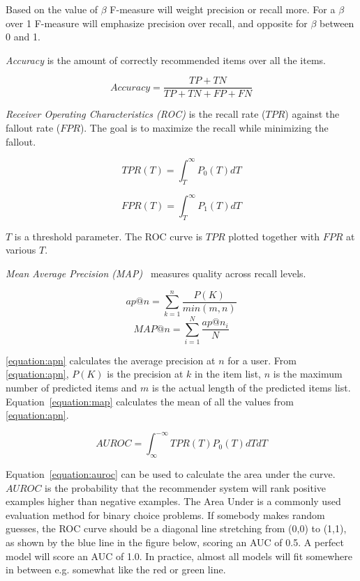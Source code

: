 Based on the value of $\beta$ F-measure will weight precision or recall more.
For a $\beta$ over 1 F-measure will emphasize precision over recall, and
opposite for $\beta$ between 0 and 1.

\textit{Accuracy} is the amount of correctly recommended items over all the
items.

\begin{equation}
    Accuracy = \frac{TP+TN}{TP+TN+FP+FN}
    \label{equation:accuracy}
\end{equation}

\textit{Receiver Operating Characteristics (ROC)} is the recall rate ($TPR$)
against the fallout rate ($FPR$).  The goal is to maximize the recall while
minimizing the fallout.

\begin{equation}
    TPR(T) = \int_T^\infty P_0(T)dT
    \label{equation:tpr}
\end{equation}

\begin{equation}
    FPR(T) = \int_T^\infty P_1(T)dT
    \label{equation:fpr}
\end{equation}

$T$ is a threshold parameter.  The ROC curve is $TPR$ plotted together with
$FPR$ at various $T$.

\textit{Mean Average Precision (MAP)}~\cite{Manning:2008:IIR:1394399} measures
quality across recall levels.

\begin{equation}
	ap@n = \sum_{k=1}^{n}{\frac{P(K)}{min(m,n)}}
	\label{equation:apn}
\end{equation}
\begin{equation}
	MAP@n = \sum_{i=1}^{N}{\frac{ap@n_i}{N}}
	\label{equation:map}
\end{equation}

\ref{equation:apn} calculates the average precision at $n$ for a user.  From
\ref{equation:apn}, $P(K)$ is the precision at $k$ in the item list, $n$ is the
maximum number of predicted items and $m$ is the actual length of the predicted
items list. Equation~\ref{equation:map} calculates the mean of all the values from
\ref{equation:apn}.

\begin{equation}
    AUROC = \int_\infty^{-\infty} TPR(T)P_0(T)dTdT
    \label{equation:auroc}
\end{equation}

Equation~\ref{equation:auroc} can be used to calculate the area under the
curve.  $AUROC$ is the probability that the recommender system will rank
positive examples higher than negative examples.  The Area Under is a commonly
used evaluation method for binary choice problems. If somebody makes random
guesses, the ROC curve should be a diagonal line stretching from (0,0) to
(1,1), as shown by the blue line in the figure below, scoring an AUC of 0.5. A
perfect model will score an AUC of 1.0. In practice, almost all models will fit
somewhere in between e.g. somewhat like the red or green line.

